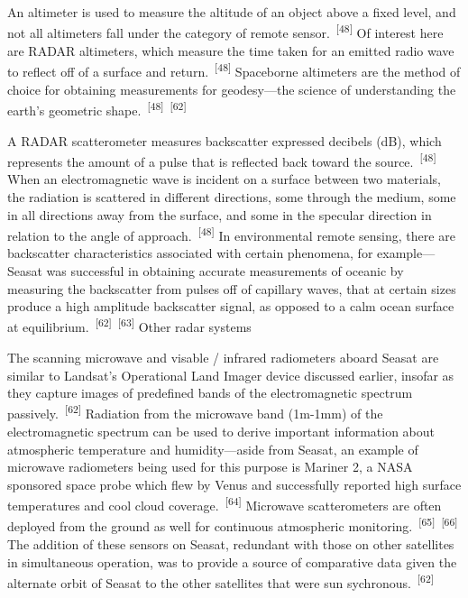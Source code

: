 \documentclass{article}
\begin{document}

\par{An altimeter is used to measure the altitude of an object above a fixed level, and not all altimeters fall under the category of remote sensor.~\textsuperscript{[48]} Of interest here are RADAR altimeters, which measure the time taken for an emitted radio wave to reflect off of a surface and return.~\textsuperscript{[48]} Spaceborne altimeters are the method of choice for obtaining measurements for geodesy---the science of understanding the earth's geometric shape.~\textsuperscript{[48]}~\textsuperscript{[62]}}


\par{A RADAR scatterometer measures backscatter expressed decibels (dB), which represents the amount of a pulse that is reflected back toward the source.~\textsuperscript{[48]}  When an electromagnetic wave is incident on a surface between two materials, the radiation is scattered in different directions, some through the medium, some in all directions away from the surface, and some in the specular direction in relation to the angle of approach.~\textsuperscript{[48]} In environmental remote sensing, there are backscatter characteristics associated with certain phenomena, for example---Seasat was successful in obtaining accurate measurements of oceanic by measuring the backscatter from pulses off of capillary waves, that at certain sizes produce a high amplitude backscatter signal, as opposed to a calm ocean surface at equilibrium.~\textsuperscript{[62]}~\textsuperscript{[63]} Other radar systems }


\par{The scanning microwave and visable / infrared radiometers aboard Seasat are similar to Landsat's Operational Land Imager device discussed earlier, insofar as they capture images of predefined bands of the electromagnetic spectrum passively.~\textsuperscript{[62]} Radiation from the microwave band (1m-1mm) of the electromagnetic spectrum can be used to derive important information about atmospheric temperature and humidity---aside from Seasat, an example of microwave radiometers being used for this purpose is Mariner 2, a NASA sponsored space probe which flew by Venus and successfully reported high surface temperatures and cool cloud coverage.~\textsuperscript{[64]} Microwave scatterometers are often deployed from the ground as well for continuous atmospheric monitoring.~\textsuperscript{[65]}~\textsuperscript{[66]} The addition of these sensors on Seasat, redundant with those on other satellites in simultaneous operation, was to provide a source of comparative data given the alternate orbit of Seasat to the other satellites that were sun sychronous.~\textsuperscript{[62]}}
\end{document}
